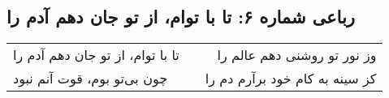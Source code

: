 \begin{center}
\section*{رباعی شماره ۶: تا با توام، از تو جان دهم آدم را}
\label{sec:006}
\begin{longtable}{l p{0.5cm} r}
تا با توام، از تو جان دهم آدم را
&&
وز نور تو روشنی دهم عالم را
\\
چون بی‌تو بوم، قوت آنم نبود
&&
کز سینه به کام خود برآرم دم را
\\
\end{longtable}
\end{center}
